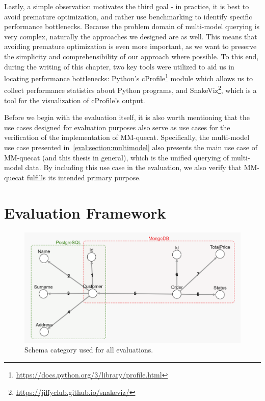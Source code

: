 Lastly, a simple observation motivates the third goal - in practice, it is best to avoid premature optimization, and rather use benchmarking to identify specific performance bottlenecks.
Because the problem domain of multi-model querying is very complex, naturally the approaches we designed are as well.
This means that avoiding premature optimization is even more important, as we want to preserve the simplicity and comprehensibility of our approach where possible.
To this end, during the writing of this chapter, two key tools were utilized to aid us in locating performance bottlenecks: Python's cProfile\footnote{\url{https://docs.python.org/3/library/profile.html}} module which allows us to collect performance statistics about Python programs, and SnakeViz\footnote{\url{https://jiffyclub.github.io/snakeviz/}}, which is a tool for the visualization of cProfile's output.

Before we begin with the evaluation itself, it is also worth mentioning that the use cases designed for evaluation purposes also serve as use cases for the verification of the implementation of MM-quecat.
Specifically, the multi-model use case presented in~\cref{eval:section:multimodel} also presents the main use case of MM-quecat (and this thesis in general), which is the unified querying of multi-model data.
By including this use case in the evaluation, we also verify that MM-quecat fulfills its intended primary purpose.

\section{Evaluation Framework}

\begin{figure}[h]
\centering
\includegraphics[width=\textwidth]{img/eval-category.png} 
\caption{Schema category used for all evaluations.}
\label{fig:evalcategory}
\end{figure}

